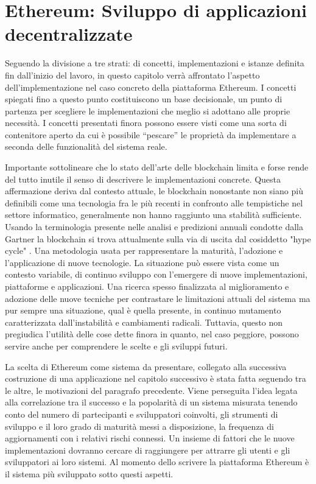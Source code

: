 \chapter{Ethereum: Sviluppo di applicazioni decentralizzate}

Seguendo la divisione a tre strati: di concetti, implementazioni e istanze definita fin dall'inizio del lavoro, in questo capitolo verrà affrontato l'aspetto dell'implementazione nel caso concreto della piattaforma Ethereum. I concetti spiegati fino a questo punto costituiscono un base decisionale, un punto di partenza per scegliere le implementazioni che meglio si adottano alle proprie necessità. I concetti presentati finora possono essere visti come una sorta di contenitore aperto da cui è possibile “pescare” le proprietà da implementare a seconda delle funzionalità del sistema reale. 

Importante sottolineare che lo stato dell'arte delle blockchain limita e forse rende del tutto inutile il senso di descrivere le implementazioni concrete. Questa affermazione deriva dal contesto attuale, le blockchain nonostante non siano più definibili come una tecnologia fra le più recenti in confronto alle tempistiche nel settore informatico, generalmente non hanno raggiunto una stabilità sufficiente. Usando la terminologia presente nelle analisi e predizioni annuali condotte dalla Gartner la blockchain si trova attualmente sulla via di uscita dal cosiddetto "hype cycle" \smallskip {}. Una metodologia usata per rappresentare la maturità, l'adozione e l'applicazione di nuove tecnologie.
La situazione può essere vista come un contesto variabile, di continuo sviluppo con l’emergere di nuove implementazioni, piattaforme e applicazioni. Una ricerca spesso finalizzata al miglioramento e adozione delle nuove tecniche per contrastare le limitazioni attuali del sistema ma pur sempre una situazione, qual è quella presente, in continuo mutamento caratterizzata dall'instabilità e cambiamenti radicali. Tuttavia, questo non pregiudica l’utilità delle cose dette finora in quanto, nel caso peggiore, possono servire anche per comprendere le scelte e gli sviluppi futuri.

La scelta di Ethereum come sistema da presentare, collegato alla successiva costruzione di una applicazione nel capitolo successivo è stata fatta seguendo tra le altre, le motivazioni del paragrafo precedente. Viene perseguita l'idea legata alla correlazione tra il successo e la popolarità di un sistema misurata tenendo conto del numero di partecipanti e sviluppatori coinvolti, gli strumenti di sviluppo e il loro grado di maturità messi a disposizione, la frequenza di aggiornamenti con i relativi rischi connessi. Un insieme di fattori che le nuove implementazioni dovranno cercare di raggiungere per attrarre gli utenti e gli sviluppatori ai loro sistemi. Al momento dello scrivere la piattaforma Ethereum è il sistema più sviluppato sotto questi aspetti.

